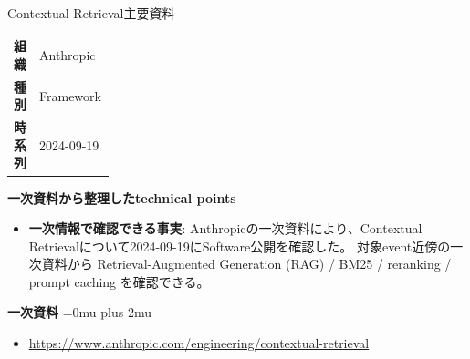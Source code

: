 \begin{technicalnote}{Contextual Retrieval}{主要資料}
\begingroup
\begin{tabularx}{\linewidth}{@{}>{\bfseries}p{0.22\linewidth}X@{}}
組織 & Anthropic \\
種別 & Framework \\
時系列 & 2024-09-19 \\
\end{tabularx}
\smallskip
{\bfseries 一次資料から整理したtechnical points}
\begin{itemize}[leftmargin=1.5em,itemsep=0.35em]
\item \textbf{一次情報で確認できる事実}: Anthropicの一次資料により、Contextual Retrievalについて2024-09-19にSoftware公開を確認した。 対象event近傍の一次資料から Retrieval-Augmented Generation (RAG) / BM25 / reranking / prompt caching を確認できる。
\end{itemize}
\begin{minipage}{\linewidth}
\begin{samepage}
{\bfseries 一次資料}
\begingroup\sloppy
\Urlmuskip=0mu plus 2mu\relax
\begin{itemize}[leftmargin=1.5em,itemsep=0.25em]
\item {\scriptsize\url{https://www.anthropic.com/engineering/contextual-retrieval}}
\end{itemize}
\endgroup
\end{samepage}
\end{minipage}
\endgroup
\end{technicalnote}
\medskip

